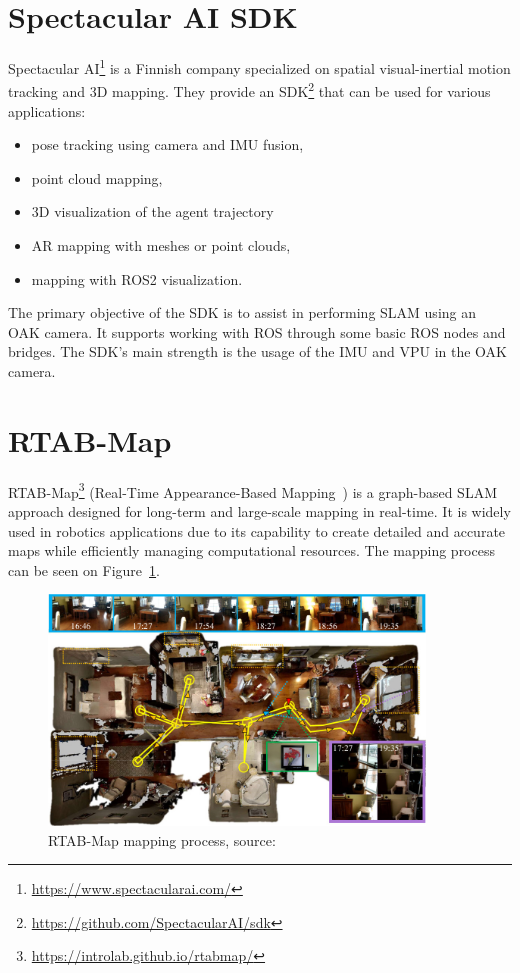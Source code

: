 \FloatBarrier
\section{Spectacular AI SDK}

Spectacular AI\footnote{\url{https://www.spectacularai.com/}} is a Finnish company specialized on spatial visual-inertial motion tracking and 3D mapping. They provide an SDK\footnote{\url{https://github.com/SpectacularAI/sdk}} that can be used for various applications:
\FloatBarrier
\begin{itemize}
\setlength\itemsep{0em}
    \item pose tracking using camera and IMU fusion,
    \item point cloud mapping,
    \item 3D visualization of the agent trajectory
    \item AR mapping with meshes or point clouds,
    \item mapping with ROS2 visualization.
\end{itemize}
\FloatBarrier
The primary objective of the SDK is to assist in performing SLAM using an OAK camera. It supports working with ROS through some basic ROS nodes and bridges. The SDK's main strength is the usage of the IMU and VPU in the OAK camera.


\section{RTAB-Map}

RTAB-Map\footnote{\url{https://introlab.github.io/rtabmap/}} (Real-Time Appearance-Based Mapping~\cite{RTAB_Map_docs}) is a graph-based SLAM approach designed for long-term and large-scale mapping in real-time. It is widely used in robotics applications due to its capability to create detailed and accurate maps while efficiently managing computational resources. The mapping process can be seen on Figure~\ref{fig:rtabmap_applied_techs}.

\begin{figure}[htbp]
    \centering
    \includegraphics[width=100mm, keepaspectratio]{figures_jpg/rtabmap_for_applied_techs.jpg}
    \caption{RTAB-Map mapping process, source:~\cite{rtabmap_applied_techs}}
    \label{fig:rtabmap_applied_techs}
\end{figure}

